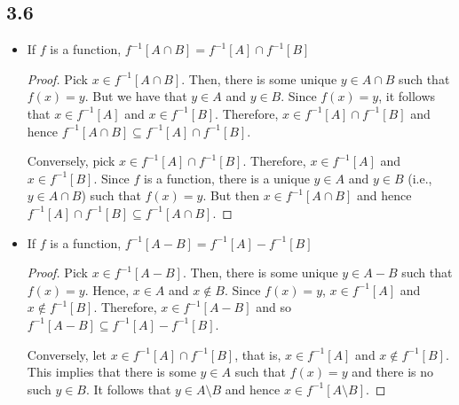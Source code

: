 \subsection*{3.6} 

\begin{itemize}
\item If $f$ is a function, $f^{-1}[A \cap B] = f^{-1}[A] \cap f^{-1}[B]$
\begin{proof}
    Pick $x \in f^{-1}[A \cap B]$. Then, there is some unique $y \in A \cap B$ such that $f(x) = y$. But we have that $y\in A$ and $y \in B$. Since $f(x) = y$, it follows that $x \in f^{-1}[A]$ and $x \in f^{-1}[B]$. Therefore, $x \in f^{-1}[A] \cap f^{-1}[B]$ and hence $f^{-1}[A \cap B] \subseteq f^{-1}[A] \cap f^{-1}[B]$.
    
    Conversely, pick $x \in f^{-1}[A] \cap f^{-1}[B]$. Therefore, $x \in f^{-1}[A]$ and $x \in f^{-1}[B]$. Since $f$ is a function, there is a unique $y \in A$ and $y \in B$ (i.e., $y \in A \cap B$) such that $f(x) = y$. But then $x \in f^{-1}[A \cap B]$ and hence $f^{-1}[A] \cap f^{-1}[B] \subseteq f^{-1}[A \cap B]$.
\end{proof}

\item If $f$ is a function, $f^{-1}[A - B] = f^{-1}[A] - f^{-1}[B]$

\begin{proof}
    Pick $x \in f^{-1}[A - B]$. Then, there is some unique $y \in A - B$ such that $f(x) = y$. Hence, $x \in A$ and $x \notin B$. Since $f(x) = y$, $x \in f^{-1}[A]$ and $x \notin f^{-1}[B]$. Therefore, $x \in f^{-1}[A - B]$ and so $f^{-1}[A - B] \subseteq f^{-1}[A] - f^{-1}[B]$.
    
    Conversely, let $x \in f^{-1}[A] \cap f^{-1}[B]$, that is, $x \in f^{-1}[A]$ and $x \notin f^{-1}[B]$. This implies that there is some $y \in A$ such that $f(x) = y$ and there is no such $y \in B$. It follows that $y \in A \setminus B$ and hence $x \in f^{-1}[A \setminus B]$.
\end{proof}

\end{itemize}

